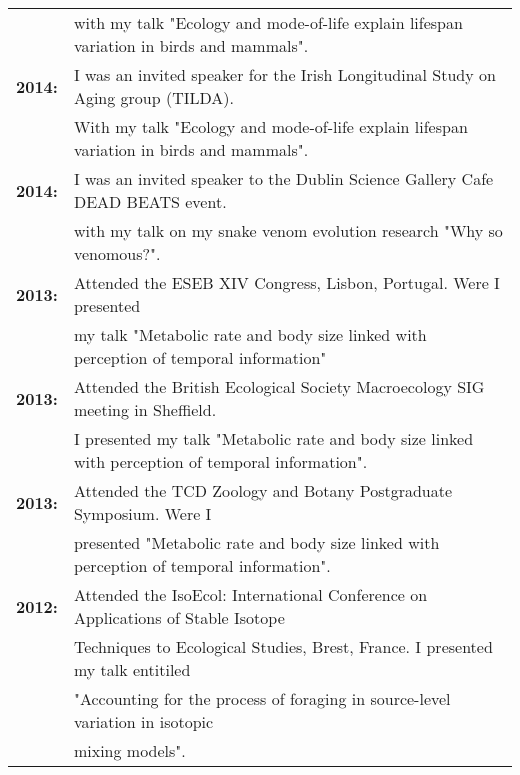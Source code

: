 \documentclass[10pt,a4paper]{article}
\begin{document}
\begin{tabular}{ll}
& with my talk "Ecology and mode-of-life explain lifespan variation in birds and mammals".\\
\textbf{2014:} & I was an invited speaker for the Irish Longitudinal Study on Aging group (TILDA).\\ 
& With my talk "Ecology and mode-of-life explain lifespan variation in birds and mammals".\\
\textbf{2014:} & I was an invited speaker to the Dublin Science Gallery Cafe DEAD BEATS event.\\ 
& with my talk on my snake venom evolution research "Why so venomous?".\\
\textbf{2013:} & Attended the ESEB XIV Congress, Lisbon, Portugal. Were I presented\\
& my talk "Metabolic rate and body size linked with perception of temporal information"\\
\textbf{2013:} & Attended the British Ecological Society Macroecology SIG meeting in Sheffield.\\
& I presented my talk "Metabolic rate and body size linked with perception of temporal information".\\
\textbf{2013:} & Attended the TCD Zoology and Botany Postgraduate Symposium. Were I\\
& presented "Metabolic rate and body size linked with perception of temporal information".\\
\textbf{2012:} & Attended the IsoEcol: International Conference on Applications of Stable Isotope\\
&Techniques to Ecological Studies, Brest, France. I presented my talk entitiled\\
&"Accounting for the process of foraging in source-level variation in isotopic\\
& mixing models".\\


\end{tabular}

\pagebreak 
\end{document}
